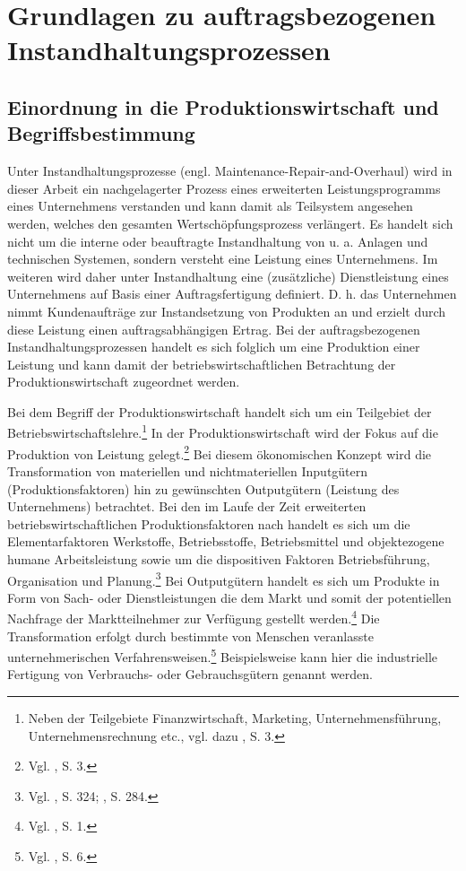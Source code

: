 \chapter{Grundlagen zu auftragsbezogenen Instandhaltungsprozessen}\label{Instandhaltung}
\setcounter{footnote}{2}  %

\section{Einordnung in die Produktionswirtschaft und Begriffsbestimmung}

Unter Instandhaltungsprozesse (engl. Maintenance-Repair-and-Overhaul) wird in dieser Arbeit ein nachgelagerter Prozess eines erweiterten Leistungsprogramms eines Unternehmens verstanden und kann damit als Teilsystem angesehen werden, welches den gesamten Wertschöpfungsprozess verlängert. Es handelt sich nicht um die interne oder beauftragte Instandhaltung von u. a. Anlagen und technischen Systemen, sondern versteht eine Leistung eines Unternehmens. Im weiteren wird daher unter Instandhaltung eine (zusätzliche) Dienstleistung eines Unternehmens auf Basis einer Auftragsfertigung definiert. D. h. das Unternehmen nimmt Kundenaufträge zur Instandsetzung von Produkten an und erzielt durch diese Leistung einen auftragsabhängigen Ertrag. Bei der auftragsbezogenen Instandhaltungsprozessen handelt es sich folglich um eine Produktion einer Leistung und kann damit der betriebswirtschaftlichen Betrachtung der Produktionswirtschaft zugeordnet werden.

Bei dem Begriff der Produktionswirtschaft handelt sich um ein Teilgebiet der Betriebswirtschaftslehre.\footnote{Neben der Teilgebiete Finanzwirtschaft, Marketing, Unternehmensführung, Unternehmensrechnung etc., vgl. dazu \cite{Dyckhoff2010}, S. 3.} In der Produktionswirtschaft wird der Fokus auf die Produktion von Leistung gelegt.\footnote{Vgl. \cite{Dyckhoff2010}, S. 3.} Bei diesem ökonomischen Konzept wird die Transformation von materiellen und nichtmateriellen Inputgütern (Produktionsfaktoren) hin zu gewünschten Outputgütern (Leistung des Unternehmens) betrachtet. Bei den im Laufe der Zeit erweiterten betriebswirtschaftlichen Produktionsfaktoren nach \citet[S. 71]{Gutenberg:1959aa} handelt es sich um die Elementarfaktoren Werkstoffe, Betriebsstoffe, Betriebsmittel und objektezogene humane Arbeitsleistung sowie um die dispositiven Faktoren Betriebsführung, Organisation und Planung.\footnote{Vgl. \cite{Schubert:2005aa}, S. 324; \cite{Weber:1999aa}, S. 284.} Bei Outputgütern handelt es sich um Produkte in Form von Sach- oder Dienstleistungen die dem Markt und somit der potentiellen Nachfrage der Marktteilnehmer zur Verfügung gestellt werden.\footnote{Vgl. \cite{Schmidt:2012aa}, S. 1.} Die Transformation erfolgt durch bestimmte von Menschen veranlasste unternehmerischen Verfahrensweisen.\footnote{Vgl. \cite{tempelmeier1994produktion}, S. 6.} Beispielsweise kann hier die industrielle Fertigung von Verbrauchs- oder Gebrauchsgütern genannt werden.

